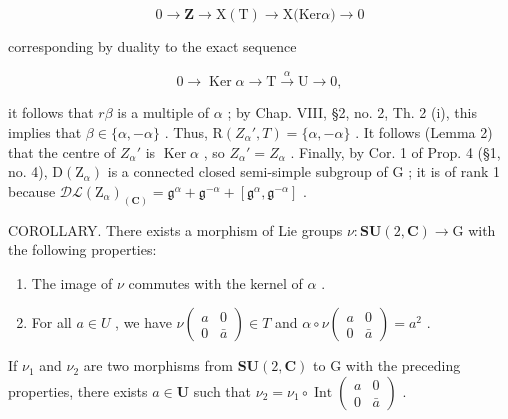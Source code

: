 \[
0 \longrightarrow \mathbf {Z} \longrightarrow \mathrm{X(T)} \longrightarrow \mathrm{X(Ker} \alpha) \longrightarrow 0
\]

corresponding by duality to the exact sequence

\[
0 \longrightarrow \operatorname{Ker} \alpha \longrightarrow \mathrm{T} \stackrel {{\alpha}} {{\longrightarrow}} \mathrm{U} \longrightarrow 0,
\]

it follows that \(r\beta\) is a multiple of \(\alpha\) ; by Chap. VIII, §2, no. 2, Th. 2 (i), this implies that \(\beta \in \{\alpha, -\alpha\}\) . Thus, \(\mathrm{R}(Z_{\alpha}', T) = \{\alpha, -\alpha\}\) . It follows (Lemma 2) that the centre of \(Z_{\alpha}'\) is \(\operatorname{Ker} \alpha\) , so \(Z_{\alpha}' = Z_{\alpha}\) . Finally, by Cor. 1 of Prop. 4 (§1, no. 4), \(\mathrm{D}(\mathrm{Z}_{\alpha})\) is a connected closed semi-simple subgroup of \(\mathrm{G}\) ; it is of rank 1 because \(\mathcal{DL}(\mathrm{Z}_{\alpha})_{(\mathbf{C})} = \mathfrak{g}^{\alpha} + \mathfrak{g}^{-\alpha} + [\mathfrak{g}^{\alpha},\mathfrak{g}^{-\alpha}]\) .

COROLLARY. There exists a morphism of Lie groups \(\nu : \mathbf{SU}(2, \mathbf{C}) \to \mathrm{G}\) with the following properties:

\begin{enumerate}
\def\labelenumi{\alph{enumi})}
\item
  The image of \(\nu\) commutes with the kernel of \(\alpha\) .
\item
  For all \(a \in U\) , we have \(\nu\left(\begin{array}{cc}a & 0 \\ 0 & \bar{a}\end{array}\right) \in T\) and \(\alpha \circ \nu\left(\begin{array}{cc}a & 0 \\ 0 & \bar{a}\end{array}\right) = a^{2}\) .
\end{enumerate}

If \(\nu_{1}\) and \(\nu_{2}\) are two morphisms from \(\mathbf{SU}(2,\mathbf{C})\) to \(\mathrm{G}\) with the preceding properties, there exists \(a\in \mathbf{U}\) such that \(\nu_{2} = \nu_{1}\circ \operatorname {Int}\left( \begin{array}{cc}a & 0\\ 0 & \bar{a} \end{array} \right)\) .

